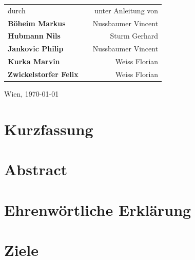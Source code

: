\documentclass[
    headings=optiontotocandhead,%
    twoside,
    numbers=noenddot,%
    toc=flat, %
    12pt, %
    titlepage, %
    parskip=full, %
    listof=totoc, %
    listof=flat, %
    numbers=noenddot, %
    bibliography=totoc, %
    a4paper,DIV=14,
    BCOR=15mm,
]{scrbook}
\begin{document}
\begin{titlepage}
\begin{center}
\vspace{1cm}

{
\renewcommand{\arraystretch}{1.8}
\begin{tabular}{l c r}
durch  & \hfill & unter Anleitung von \\
\textbf{\large{}Böheim Markus} && Nussbaumer Vincent \\
\textbf{\large{}Hubmann Nils} && Sturm Gerhard \\
\textbf{\large{}Jankovic Philip} && Nussbaumer Vincent \\
\textbf{\large{}Kurka Marvin} && Weiss Florian \\
\textbf{\large{}Zwickelstorfer Felix} && Weiss Florian \\
\end{tabular}
}

\vfill

Wien, \today
\par\end{center}

\end{titlepage}

\chapter*{Kurzfassung}


\chapter*{Abstract}


\chapter*{Ehrenwörtliche Erklärung}


\cleardoublepage{}
\tableofcontents{}
\cleardoublepage{}
\listoftables
{}
\cleardoublepage{}
\listoffigures


\cleardoublepage{}
\mainmatter

\chapter{Ziele}
\end{document}
